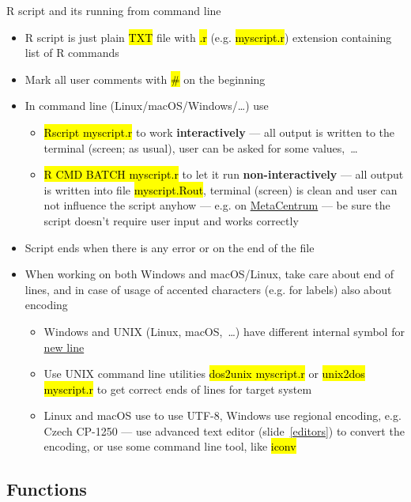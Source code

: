 \documentclass[compress, ucs, xelatex, 11pt, xcolor=svgnames,
	hyperref={
		bookmarks=true,
		unicode=true,
		colorlinks=true,
		pdftitle={Molecular data in R},
		plainpages=false,
		pdfauthor={Vojtech Zeisek},
		pdfsubject={Course about phylogeny and evolution in R},
		pdfcreator={XeLaTeX},
		pdfkeywords={R, evolution, phylogeny, molecular data},
		linkcolor=Tomato,
		anchorcolor=SaddleBrown,
		citecolor=Goldenrod,
		filecolor=DarkMagenta,
		menucolor=Sienna,
		urlcolor=DarkTurquoise,
		pdftex},
	url={hyphens, lowtilde} %
	]{beamer}
\renewcommand{\texttt}[1]{\hl{\ttfamily #1}}
\begin{document}
\begin{frame}[allowframebreaks]{R script and its running from command line}
	\begin{itemize}
		\item R script is just plain \texttt{TXT} file with \texttt{.r} (e.g. \texttt{myscript.r}) extension containing list of R commands
		\item Mark all user comments with \texttt{\#} on the beginning
		\item In command line (Linux/macOS/Windows/\ldots) use
		\begin{itemize}
			\item \texttt{Rscript myscript.r} to work \textbf{interactively} --- all output is written to the terminal (screen; as usual), user can be asked for some values,~\ldots
			\item \texttt{R CMD BATCH myscript.r} to let it run \textbf{non-interactively} --- all output is written into file \texttt{myscript.Rout}, terminal (screen) is clean and user can not influence the script anyhow --- e.g. on \href{https://www.metacentrum.cz/en/}{MetaCentrum} --- be sure the script doesn't require user input and works correctly
		\end{itemize}
		\item Script ends when there is any error or on the end of the file
		\item When working on both Windows and macOS/Linux, take care about end of lines, and in case of usage of accented characters (e.g. for labels) also about encoding
		\begin{itemize}
			\item Windows and UNIX (Linux, macOS,~\ldots) have different internal symbol for \href{https://en.wikipedia.org/wiki/Newline}{new line}
			\item Use UNIX command line utilities \texttt{dos2unix myscript.r} or \texttt{unix2dos myscript.r} to get correct ends of lines for target system
			\item Linux and macOS use to use UTF-8, Windows use regional encoding, e.g. Czech CP-1250 --- use advanced text editor (slide~\ref{editors}) to convert the encoding, or use some command line tool, like \texttt{iconv}
		\end{itemize}
	\end{itemize}
\end{frame}

\subsection{Functions}
\end{document}
